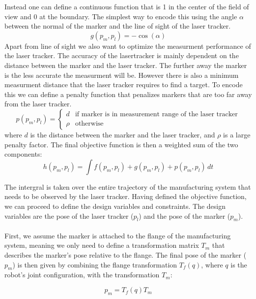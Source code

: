 \documentclass{svproc}
\begin{document}
Instead one can define a continuous function that is 1 in the center of the field of view and 0 at the boundary.
The simplest way to encode this using the angle $\alpha$ between the normal of the marker and the line of sight of the laser tracker.
\begin{equation}
    g(p_m,p_l) = -\cos(\alpha)
\end{equation}
Apart from line of sight we also want to optimize the measurment performance of the laser tracker.
The accuracy of the lasertracker is mainly dependent on the distance between the marker and the laser tracker.
The further away the marker is the less accurate the measurment will be. However there is also a minimum measurment distance that the laser tracker requires to find a target.
To encode this we can define a penalty function that penalizes markers that are too far away from the laser tracker.
\begin{equation}
    p(p_m,p_l) =  \begin{cases}
        d & \text{if marker is in measurement range of the laser tracker} \\
        \rho & \text{otherwise}
    \end{cases}
\end{equation}
where $d$ is the distance between the marker and the laser tracker, and $\rho$ is a large penalty factor.
The final objective function is then a weighted sum of the two components:
\begin{equation}
    h(p_m,p_l) = \int f(p_m,p_l) +  g(p_m,p_l) + p(p_m,p_l) \, dt
    \label{eq:objective}
\end{equation}

The intergral is taken over the entire trajectory of the manufacturing system that needs to be observed by the laser tracker.
Having defined the objective function, we can proceed to define the design variables and constraints.
The design variables are the pose of the laser tracker ($p_l$) and the pose of the marker ($p_m$).\\
\\
First, we assume the marker is attached to the flange of the manufacturing system, meaning we only need to define a transformation matrix $T_{m}$ that describes the marker's pose relative to the flange.
The final pose of the marker ($p_m$) is then given by combining the flange transformation $T_{f}(q)$, where $q$ is the robot's joint configuration, with the transformation $T_{m}$:

\begin{equation}
    p_m = T_{f}(q)T_{m}
\end{equation}
\end{document}
